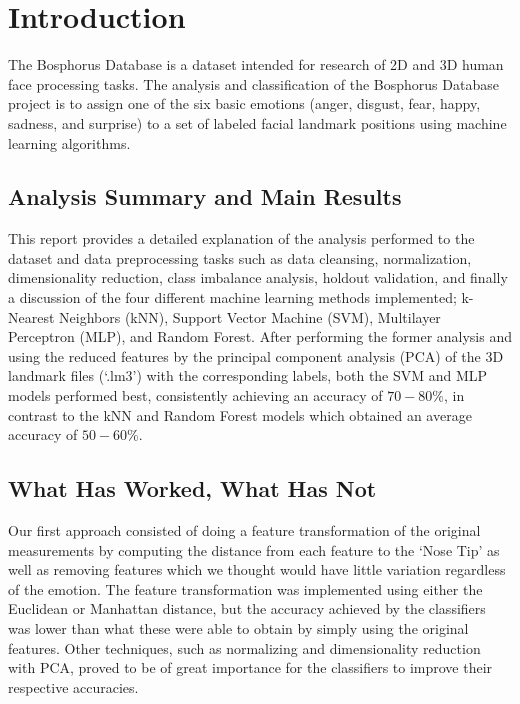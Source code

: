 \section{Introduction}

The Bosphorus Database is a dataset intended for research of 2D and 3D human face processing tasks. The analysis and classification of the Bosphorus Database project is to assign one of the six basic emotions (anger, disgust, fear, happy, sadness, and surprise) to a set of labeled facial landmark positions using machine learning algorithms.

\subsection{Analysis Summary and Main Results} \label{intro:analysis-summary-and-main-results}
This report provides a detailed explanation of the analysis performed to the dataset and data preprocessing tasks such as data cleansing, normalization, dimensionality reduction, class imbalance analysis, holdout validation, and finally a discussion of the four different machine learning methods implemented; k-Nearest Neighbors (kNN), Support Vector Machine (SVM), Multilayer Perceptron (MLP), and Random Forest. After performing the former analysis and using the reduced features by the principal component analysis (PCA) of the 3D landmark files (`.lm3') with the corresponding labels, both the SVM and MLP models performed best, consistently achieving an accuracy of $70-80\%$, in contrast to the kNN and Random Forest models which obtained an average accuracy of $50-60\%$.

\subsection{What Has Worked, What Has Not} \label{intro:what-has-worked-what-has-not}
Our first approach consisted of doing a feature transformation of the original measurements by computing the distance from each feature to the `Nose Tip' as well as removing features which we thought would have little variation regardless of the emotion. The feature transformation was implemented using either the Euclidean or Manhattan distance, but the accuracy achieved by the classifiers was lower than what these were able to obtain by simply using the original features. Other techniques, such as normalizing and dimensionality reduction with PCA, proved to be of great importance for the classifiers to improve their respective accuracies.

